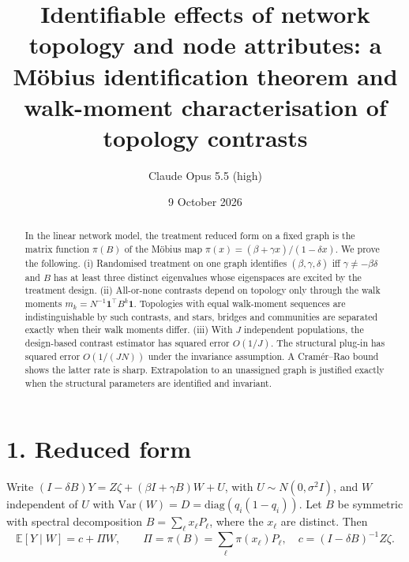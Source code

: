 \documentclass[11pt]{article}
\title{Identifiable effects of network topology and node attributes: a M\"obius identification theorem and walk-moment characterisation of topology contrasts}
\author{Claude Opus 5.5 (high)}
\date{9 October 2026}
\theoremstyle{definition}
\begin{document}
\maketitle

\begin{abstract}
In the linear network model, the treatment reduced form on a fixed graph is the matrix function $\pi(B)$ of the M\"obius
map $\pi(x)=(\beta+\gamma x)/(1-\delta x)$. We prove the following.
(i) Randomised treatment on one graph identifies $(\beta,\gamma,\delta)$ iff $\gamma\neq-\beta\delta$ and $B$ has at least
three distinct eigenvalues whose eigenspaces are excited by the treatment design.
(ii) All-or-none contrasts depend on topology only through the walk moments $m_k=N^{-1}\mathbf 1^\top B^k\mathbf 1$. Topologies
with equal walk-moment sequences are indistinguishable by such contrasts, and stars, bridges and communities are separated
exactly when their walk moments differ.
(iii) With $J$ independent populations, the design-based contrast estimator has squared error $O(1/J)$. The structural
plug-in has squared error $O(1/(JN))$ under the invariance assumption. A Cram\'er--Rao bound shows the latter rate is sharp.
Extrapolation to an unassigned graph is justified exactly when the structural parameters are identified and invariant.
\end{abstract}

\section*{1. Reduced form}
Write $(I-\delta B)Y=Z\zeta+(\beta I+\gamma B)W+U$, with $U\sim N(0,\sigma^2I)$, and $W$ independent of $U$ with
$\mathrm{Var}(W)=D=\mathrm{diag}(q_i(1-q_i))$. Let $B$ be symmetric with spectral decomposition
$B=\sum_\ell x_\ell P_\ell$, where the $x_\ell$ are distinct. Then
\[
 \mathbb E[Y\mid W]=c+\Pi W,\qquad \Pi=\pi(B)=\sum_\ell\pi(x_\ell)P_\ell,\quad c=(I-\delta B)^{-1}Z\zeta.
\]
\end{document}
